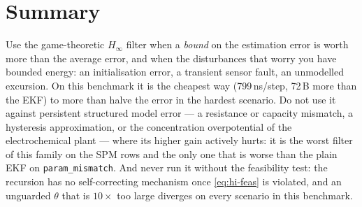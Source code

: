 \section{Summary}
Use the game-theoretic $H_\infty$ filter when a \emph{bound} on the estimation error is worth more
than the average error, and when the disturbances that worry you have bounded energy: an
initialisation error, a transient sensor fault, an unmodelled excursion.  On this benchmark it is
the cheapest way (799\,ns/step, 72\,B more than the EKF) to more than
halve the error in the hardest scenario.  Do not use it against persistent structured model error
--- a resistance or capacity mismatch, a hysteresis approximation, or the concentration
overpotential of the electrochemical plant --- where its higher gain actively hurts: it is the
worst filter of this family on the SPM rows and the only one that is worse than the plain EKF on
\texttt{param\_mismatch}.  And never run it without
the feasibility test: the recursion has no self-correcting mechanism once \eqref{eq:hi-feas} is
violated, and an unguarded $\theta$ that is $10\times$ too large diverges on every scenario in
this benchmark.
